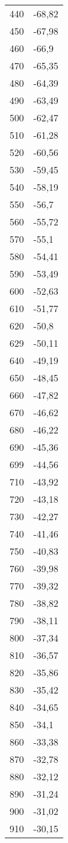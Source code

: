 \begin{table}
\begin{tabular}{rl}
440	&	-68,82\\
450	&	-67,98\\
460	&	-66,9\\
470	&	-65,35\\
480	&	-64,39\\
490	&	-63,49\\
500	&	-62,47\\
510	&	-61,28\\
520	&	-60,56\\
530	&	-59,45\\
540	&	-58,19\\
550	&	-56,7\\
560	&	-55,72\\
570	&	-55,1\\
580	&	-54,41\\
590	&	-53,49\\
600	&	-52,63\\
610	&	-51,77\\
620	&	-50,8\\
629	&	-50,11\\
640	&	-49,19\\
650	&	-48,45\\
660	&	-47,82\\
670	&	-46,62\\
680	&	-46,22\\
690	&	-45,36\\
699	&	-44,56\\
710	&	-43,92\\
720	&	-43,18\\
730	&	-42,27\\
740	&	-41,46\\
750	&	-40,83\\
760	&	-39,98\\
770	&	-39,32\\
780	&	-38,82\\
790	&	-38,11\\
800	&	-37,34\\
810	&	-36,57\\
820	&	-35,86\\
830	&	-35,42\\
840	&	-34,65\\
850	&	-34,1\\
860	&	-33,38\\
870	&	-32,78\\
880	&	-32,12\\
890	&	-31,24\\
900	&	-31,02\\
910	&	-30,15\\

\end{tabular}
\end{table}
